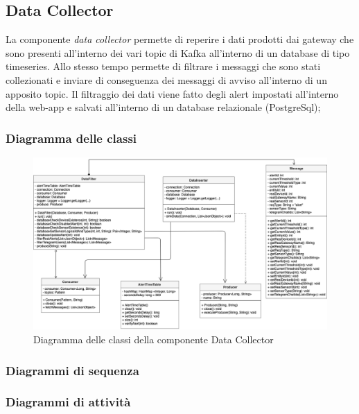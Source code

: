 \subsection{Data Collector}
La componente \textit{data collector} permette di reperire i dati prodotti dai gateway che sono presenti all'interno dei vari topic di Kafka all'interno di un database di tipo timeseries. Allo stesso tempo permette di filtrare i messaggi che sono stati collezionati e inviare di conseguenza dei messaggi di avviso all'interno di un apposito topic.
Il filtraggio dei dati viene fatto degli alert impostati all'interno della web-app e salvati all'interno di un database relazionale (PostgreSql);
\begin{landscape}
	\subsubsection{Diagramma delle classi}
		\begin{figure}[H]
			\centering
			\includegraphics[scale=0.500]{res/images/DATACOLLECTOR/ClassikafkaDataCollector.png}
			\caption{Diagramma delle classi della componente Data Collector}
		\end{figure}
\end{landscape}
\subsubsection{Diagrammi di sequenza}
\subsubsection{Diagrammi di attività}